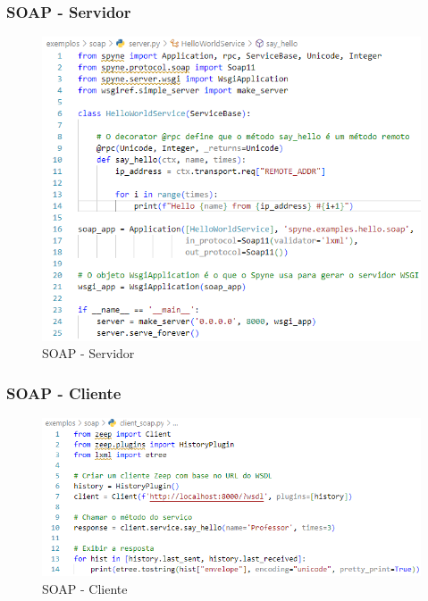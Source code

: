 \documentclass[
	10pt, %
	t, %
]{beamer}
\begin{document}
\begin{frame}[fragile]
	\frametitle{SOAP - Servidor}
	
	\begin{figure}
		\includegraphics[width=0.7\linewidth]{server_soap.PNG}
		\caption{SOAP - Servidor}
		\label{fig:soap_server}
	\end{figure}

\end{frame}

\begin{frame}[fragile]
	\frametitle{SOAP - Cliente}
	
	\begin{figure}
		\includegraphics[width=0.9\linewidth]{client_soap.PNG}
		\caption{SOAP - Cliente}
		\label{fig:soap_client}
	\end{figure}

\end{frame}
\end{document}
